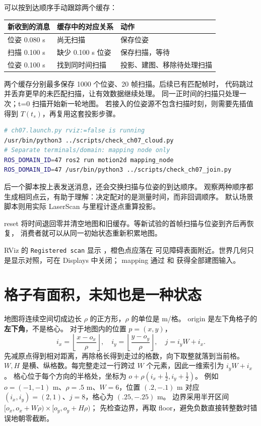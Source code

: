 可以按到达顺序手动跟踪两个缓存：
\begin{center}
\begin{tabular}{lll}
\toprule
新收到的消息 & 缓存中的对应关系 & 动作\\\midrule
位姿 0.080 s & 尚无扫描 & 保存位姿\\
扫描 0.100 s & 缺少 0.100 s 位姿 & 保存扫描，等待\\
位姿 0.100 s & 找到同时间扫描 & 投影、建图、移除待处理扫描\\
\bottomrule
\end{tabular}
\end{center}
两个缓存分别最多保存 1000 个位姿、20 帧扫描。后续已有匹配帧时，
代码跳过并丢弃更早的未匹配扫描，让有效数据继续处理。
同一正时间的扫描只处理一次；t=0 扫描开始新一轮地图。
若接入的位姿源不包含扫描时刻，则需要先插值得到 $T(t_s)$，再复用这套投影步骤。

\begin{lstlisting}[language=bash,numbers=none]
# ch07.launch.py rviz:=false is running
/usr/bin/python3 ../scripts/check_ch07_cloud.py
# Separate terminals/domain: mapping node only
ROS_DOMAIN_ID=47 ros2 run motion2d mapping_node
ROS_DOMAIN_ID=47 /usr/bin/python3 ../scripts/check_ch07_join.py
\end{lstlisting}
后一个脚本按上表发送消息，还会交换扫描与位姿的到达顺序。
观察两种顺序都生成相同点云，有助于理解：决定配对的是测量时间，而非回调顺序。
默认场景脚本则用实际 LaserScan 与里程计逐点重算投影。

reset 将时间退回零并清空地图和旧缓存。等新试验的首帧扫描与位姿到齐后再恢复，
消费者就可以从同一初始状态重新积累地图。

RViz 的 \texttt{Registered scan} 显示 ，橙色点应落在
可见障碍表面附近。世界几何只是显示对照，可在 Displays 中关闭；
mapping 通过  和  获得全部建图输入。

\section{格子有面积，未知也是一种状态}
地图将连续空间切成边长 $\rho$ 的正方形，$\rho$ 的单位是 m/格。
origin 是左下角格子的\textbf{左下角}，不是格心。
对于地图内的位置 $p=(x,y)$，
\begin{equation}
 i_x=\left\lfloor\frac{x-o_x}{\rho}\right\rfloor,\quad
 i_y=\left\lfloor\frac{y-o_y}{\rho}\right\rfloor,\quad
 j=i_yW+i_x.
\end{equation}
先减原点得到相对距离，再除格长得到走过的格数，向下取整就落到当前格。
$W,H$ 是横、纵格数。每完整走过一行跨过 $W$ 个元素，因此一维索引为 $i_yW+i_x$。
格心位于每个方向的半格处，坐标为 $o+\rho(i_x+\tfrac12,i_y+\tfrac12)$。
例如 $o=(-1,-1)$ m、$\rho=.5$ m、$W=6$，位置 $(.2,-.1)$ m 对应
$(i_x,i_y)=(2,1)$、$j=8$，格心为 $(.25,-.25)$ m。
边界采用半开区间 $[o_x,o_x+W\rho)\times[o_y,o_y+H\rho)$；
先检查边界，再取 floor，避免负数直接转整数时错误地朝零截断。

